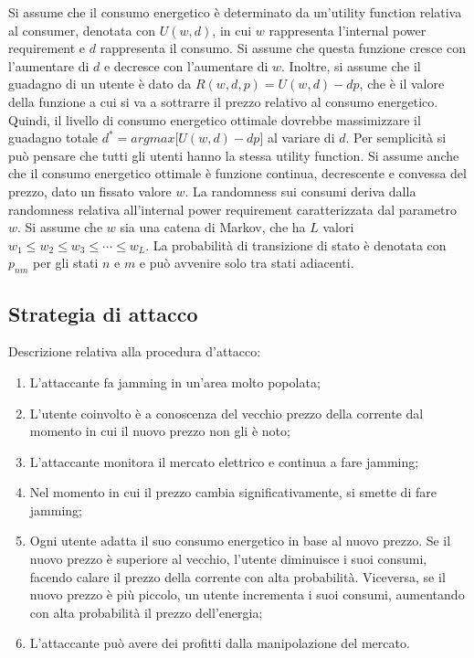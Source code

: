 Si assume che il consumo energetico è determinato da un'utility function relativa al consumer, denotata con $U(w,d)$, in cui $w$ rappresenta l'internal power requirement e $d$ rappresenta il consumo. Si assume che questa funzione cresce con l'aumentare di $d$ e decresce con l'aumentare di $w$. Inoltre, si assume che il guadagno di un utente è dato da $R(w,d,p) = U(w,d) - dp$, che è il valore della funzione a cui si va a sottrarre il prezzo relativo al consumo energetico. Quindi, il livello di consumo energetico ottimale dovrebbe massimizzare il guadagno totale $d^{*} = arg max \Big[U(w,d) - dp\Big]$ al variare di $d$. Per semplicità si può pensare che tutti gli utenti hanno la stessa utility function. Si assume anche che il consumo energetico ottimale è funzione continua, decrescente e convessa del prezzo, dato un fissato valore $w$. La randomness sui consumi deriva dalla randomness relativa all'internal power requirement caratterizzata dal parametro $w$. Si assume che $w$ sia una catena di Markov, che ha $L$ valori $w_{1} \leq w_{2} \leq w_{3} \leq \cdots \leq w_{L}$. La probabilità di transizione di stato è denotata con $p_{nm}$ per gli stati $n$ e $m$ e può avvenire solo tra stati adiacenti.
\newpage
\subsection{Strategia di attacco}
Descrizione relativa alla procedura d'attacco:
\begin{enumerate}
	\item L'attaccante fa jamming in un'area molto popolata;
	\item L'utente coinvolto è a conoscenza del vecchio prezzo della corrente dal momento in cui il nuovo prezzo non gli è noto;
	\item L'attaccante monitora il mercato elettrico e continua a fare jamming;
	\item Nel momento in cui il prezzo cambia significativamente, si smette di fare jamming;
	\item Ogni utente adatta il suo consumo energetico in base al nuovo prezzo. Se il nuovo prezzo è superiore al vecchio, l'utente diminuisce i suoi consumi, facendo calare il prezzo della corrente con alta probabilità. Viceversa, se il nuovo prezzo è più piccolo, un utente incrementa i suoi consumi, aumentando con alta probabilità il prezzo dell'energia;
	\item L'attaccante può avere dei profitti dalla manipolazione del mercato.
\end{enumerate}

